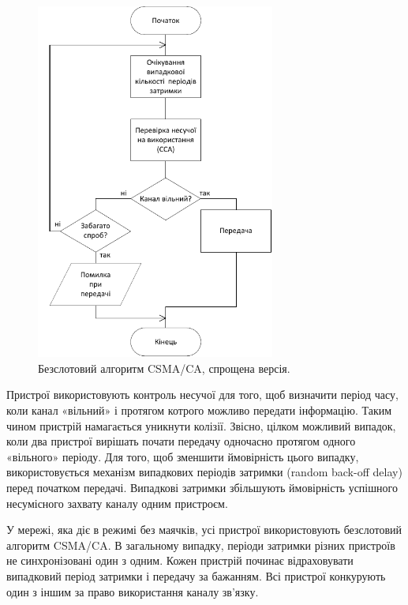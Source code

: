 \documentclass[a4paper,ukrainian,utf8,nocolumnsxix,floatsection]{eskdtext}
\newcommand{\csma}[0]{CSMA/CA\xspace}
\begin{document}
\begin{figure}[bth]
	\centering
	\includegraphics[width=0.7\textwidth]{img/csma-ca.pdf}
	\caption{\label{fig:csma-ca}Безслотовий алгоритм \csma, спрощена версія.}
\end{figure}

Пристрої використовують контроль несучої для того, щоб визначити період часу, коли канал «вільний» і протягом котрого можливо передати інформацію. Таким чином пристрій намагається уникнути колізії. Звісно, цілком можливий випадок, коли два пристрої вирішать почати передачу  одночасно протягом одного  «вільного» періоду. Для того, щоб зменшити ймовірність цього випадку, використовується механізм випадкових періодів затримки (random back-off delay) перед початком передачі. Випадкові затримки збільшують ймовірність успішного несумісного захвату каналу одним пристроєм.

У мережі, яка діє в режимі без маячків, усі пристрої використовують безслотовий алгоритм \csma. В загальному випадку, періоди затримки різних пристроїв не синхронізовані один з одним.  Кожен пристрій починає відраховувати випадковий період затримки і передачу за бажанням. Всі пристрої конкурують один з іншим за право використання каналу зв’язку. 

\clearpage
\end{document}
